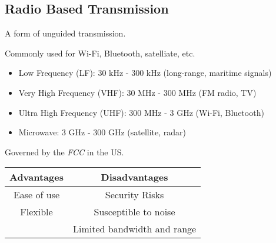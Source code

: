 \documentclass{article}
\begin{document}
\subsection*{Radio Based Transmission}

A form of unguided transmission.

Commonly used for Wi-Fi, Bluetooth, satelliate, etc.
\begin{itemize}
    \item Low Frequency (LF): 30 kHz - 300 kHz (long-range, maritime signals)
    \item Very High Frequency (VHF): 30 MHz - 300 MHz (FM radio, TV)
    \item Ultra High Frequency (UHF): 300 MHz - 3 GHz (Wi-Fi, Bluetooth)
    \item Microwave: 3 GHz - 300 GHz (satellite, radar)
\end{itemize}

Governed by the \emph{FCC} in the US.

\begin{tabular}{cc}
    Advantages  & Disadvantages               \\ \hline
    Ease of use & Security Risks              \\
    Flexible    & Susceptible to noise        \\
                & Limited bandwidth and range
\end{tabular}
\end{document}
